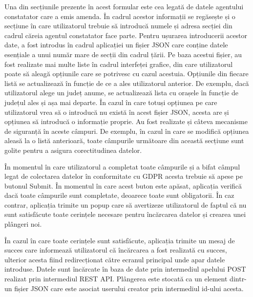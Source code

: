 \documentclass[12pt,a4paper]{report}
\theoremstyle{definition}
\theoremstyle{remark}
\begin{document}
\newpage
Una din secțiunile prezente în acest formular este cea legată de datele agentului constatator care a emis amenda. În cadrul acestor informații se regăsește și o secțiune în care utilizatorul trebuie să introducă numele și adresa secției din cadrul căreia agentul constatator face parte. Pentru ușurarea introducerii acestor date, a fost introdus în cadrul aplicației un fișier JSON care conține datele esențiale a unui număr mare de secții din cadrul țării. Pe baza acestui fișier, au fost realizate mai multe liste în cadrul interfeței grafice, din care utilizatorul poate să aleagă opțiunile care se potrivesc cu cazul acestuia. Opțiunile din fiecare listă se actualizează în funcție de ce a ales utilizatorul anterior. De exemplu, dacă utilizatorul alege un județ anume, se actualizează lista cu orașele în funcție de județul ales și așa mai departe. În cazul în care totuși opțiunea pe care utilizatorul vrea să o introducă nu există în acest fișier JSON, acesta are și opțiunea să introducă o informație proprie. Au fost realizate și câteva mecanisme de siguranță în aceste câmpuri. De exemplu, în cazul în care se modifică opțiunea aleasă la o listă anterioară, toate câmpurile următoare din această secțiune sunt golite pentru a asigura corectitudinea datelor.

În momentul în care utilizatorul a completat toate câmpurile și a bifat câmpul legat de colectarea datelor în conformitate cu GDPR acesta trebuie să apese pe butonul Submit. În momentul în care acest buton este apăsat, aplicația verifică dacă toate câmpurile sunt completate, deoarece toate sunt obligatorii. În caz contrar, aplicația trimite un popup care să avertizeze utilizatorul de faptul că nu sunt satisfăcute toate cerințele necesare pentru încărcarea datelor și crearea unei plângeri noi. 

În cazul în care toate cerințele sunt satisfăcute, aplicația trimite un mesaj de succes care informează utilizatorul că încărcarea a fost realizată cu succes, ulterior acesta fiind redirecționat către ecranul principal unde apar datele introduse. Datele sunt încărcate în baza de date prin intermediul apelului POST realizat prin intermediul REST API. Plângerea este stocată ca un element dintr-un fișier JSON care este asociat userului creator prin intermediul id-ului acesta. 
\end{document}
